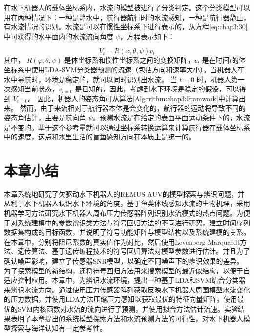 在水下机器人的载体坐标系内，水流的模型被进行了分类判定。这个分类模型可以用在两种情况下：一种是静水中，航行器航行时的水流感知，一种是航行器静止，有水流情况的识别。水流是可以在惯性坐标系下进行表示的，从方程\ref{eq:chap3:30}中可获得的水平面内的水流流向角度 $\psi$，方程表示如下：

\begin{equation}
\label{eq:chap3:30}
V_t = R\left (  \varphi,\theta,\psi \right )v_t
\end{equation}
其中， $R\left ( \varphi,\theta,\psi \right )$ 是体坐标系和惯性坐标系之间的变换矩阵，$v_t$ 是在时间$t$的体坐标系中使用LDA-SVM分类器预测的流速（包括方向和速率大小）。当机器人在水中导航时，环境是稳定的，就可以同时识别出水流。 当 $t=0$ 时，机器人第一次感知当前状态，$v_{t=0}$ 是已知的，因此，考虑到水下环境是稳定的假设，可以得到 $V_{t=0}$。 因此，机器人的姿态角可从算法\ref{Algorithm:chap3:Framwork}中计算出来。 然而，由于来流相对于航行器本体是会变化的，航行器的运动将导致不同的姿态角估计，主要是航向角 $\psi$。预测水流是在给定的表面平面运动条件下的，水流是不变的。基于这个参考量就可以通过坐标系转换运算来计算航行器在载体坐标系中的速度，这点和水里生活的盲鱼感知方向在本质上是统一的。


\section{本章小结 }

本章系统地研究了欠驱动水下机器人的REMUS AUV的模型探索与辨识问题，并从利于水下机器人认识水下环境的角度，基于鱼类体线感知水流的生物机理，采用机器学习方法研究水下机器人周布压力传感器阵列识别水流模式的热点问题。为便于对系统建模中的参数辨识类方法与符号回归方法的不同进行研究，建立时间序列数据集构成的目标函数，并说明了符号功能矩阵与模型结构以及系统建模的关系。在本章中，分别将阻尼系数的真实值作为对比，然后使用Levenberg-Marquardt方法、遗传算法、基于遗传编程技术的符号回归算法对模型参数进行估计。并且为了确认噪声影响，建立了传感器SNR模型，以确定不同噪声下的辨识效果的差异。为了探索模型的新结构，还将符号回归方法用来搜索模型的最近似结构，以便于自适应控制应用。本章中，为辨识水流环境，提出一种基于LDA和SVM结合分类器来辨识水流方向。通过使用压力传感器阵列获取反映水下机器人周围模型水流变化的压力数据，并使用LDA方法压缩压力感知以获取最优的特征向量矩阵。使用最优的SVM内核函数对水流的流向进行了预测，并使用拟合方法估计流速。实验结果表明了本章提出的系统模型探索方法和水流预测方法的可行性，对水下机器人模型探索与海洋认知有一定参考性。
